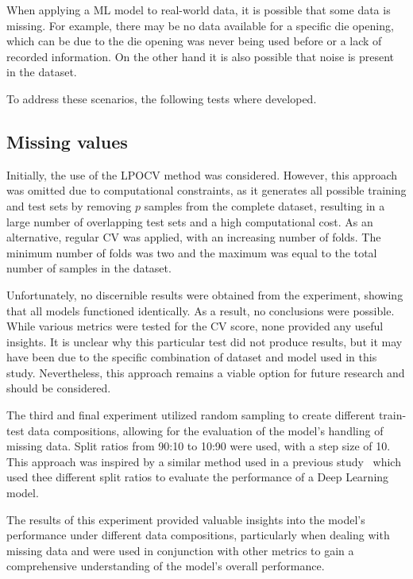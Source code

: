 When applying a \ac{ML} model to real-world data, it is possible that some data is missing.
For example, there may be no data available for a specific die opening, which can be due to the die opening
was never being used before or a lack of recorded information.
On the other hand it is also possible that noise is present in the dataset.

To address these scenarios, the following tests where developed.

\subsection{Missing values}

Initially, the use of the \ac{LPOCV} method was considered.
However, this approach was omitted due to computational constraints, as it generates all possible
training and test sets by removing $p$ samples from the complete dataset, resulting in a large
number of overlapping test sets and a high computational cost.
As an alternative, regular CV was applied, with an increasing number of folds.
The minimum number of folds was two and the maximum was equal to the total number of samples in the
dataset.


Unfortunately, no discernible results were obtained from the experiment, showing that all models functioned identically.
As a result, no conclusions were possible.
While various metrics were tested for the CV score, none provided any useful insights.
It is unclear why this particular test did not produce results, but it may have been due to the specific combination
of dataset and model used in this study.
Nevertheless, this approach remains a viable option for future research and should be considered.

The third and final experiment utilized random sampling to create different train-test data compositions, allowing
for the evaluation of the model's handling of missing data.
Split ratios from 90:10 to 10:90 were used, with a step size of 10.
This approach was inspired by a similar method used in a previous study~\cite[p. 570--574]{liu2021deep}  which used
thee different split ratios to evaluate the performance of a Deep Learning model.

The results of this experiment provided valuable insights into the model's performance under
different data compositions, particularly when dealing with missing
data and were used in conjunction with other metrics to gain a comprehensive understanding of
the model's overall performance.

